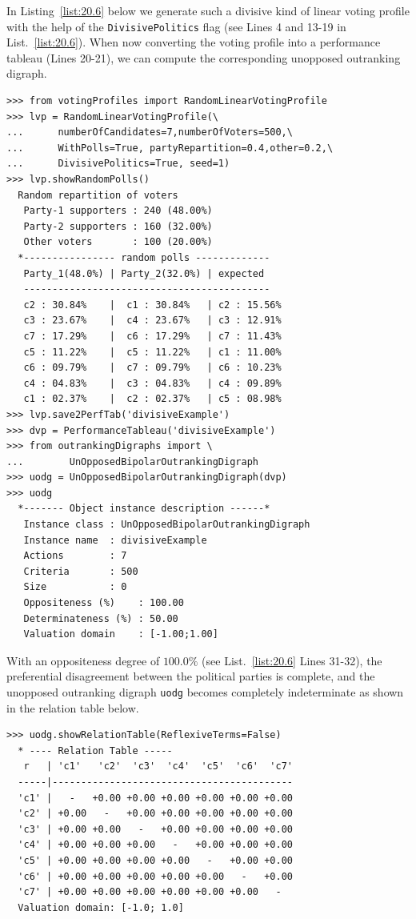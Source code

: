 In Listing~\vref{list:20.6} below we generate such a divisive kind of linear voting profile with the help of the \texttt{DivisivePolitics} flag (see Lines 4 and 13-19 in List.~\vref{list:20.6}). When now converting the voting profile into a performance tableau (Lines 20-21), we can compute the corresponding unopposed outranking digraph.
\begin{lstlisting}[caption={A divisive two-party example of a random linear voting profile},label=list:20.6]
>>> from votingProfiles import RandomLinearVotingProfile		     
>>> lvp = RandomLinearVotingProfile(\
...      numberOfCandidates=7,numberOfVoters=500,\
...      WithPolls=True, partyRepartition=0.4,other=0.2,\
...      DivisivePolitics=True, seed=1)
>>> lvp.showRandomPolls()
  Random repartition of voters
   Party-1 supporters : 240 (48.00%)
   Party-2 supporters : 160 (32.00%)
   Other voters       : 100 (20.00%)
  *---------------- random polls -------------
   Party_1(48.0%) | Party_2(32.0%) | expected  
   -------------------------------------------
   c2 : 30.84%    |  c1 : 30.84%   | c2 : 15.56%
   c3 : 23.67%    |  c4 : 23.67%   | c3 : 12.91%
   c7 : 17.29%    |  c6 : 17.29%   | c7 : 11.43%
   c5 : 11.22%    |  c5 : 11.22%   | c1 : 11.00%
   c6 : 09.79%    |  c7 : 09.79%   | c6 : 10.23%
   c4 : 04.83%    |  c3 : 04.83%   | c4 : 09.89%
   c1 : 02.37%    |  c2 : 02.37%   | c5 : 08.98%
>>> lvp.save2PerfTab('divisiveExample')
>>> dvp = PerformanceTableau('divisiveExample')
>>> from outrankingDigraphs import \
...        UnOpposedBipolarOutrankingDigraph
>>> uodg = UnOpposedBipolarOutrankingDigraph(dvp)
>>> uodg
  *------- Object instance description ------*
   Instance class : UnOpposedBipolarOutrankingDigraph
   Instance name  : divisiveExample
   Actions        : 7
   Criteria       : 500
   Size           : 0
   Oppositeness (%)    : 100.00
   Determinateness (%) : 50.00
   Valuation domain    : [-1.00;1.00]
\end{lstlisting}

With an oppositeness degree of $100.0\%$ (see List.~\vref{list:20.6} Lines 31-32), the preferential disagreement between the political parties is complete, and the unopposed outranking digraph \texttt{uodg} becomes completely indeterminate as shown in the relation table below.
\begin{lstlisting}
>>> uodg.showRelationTable(ReflexiveTerms=False)
  * ---- Relation Table -----
   r   | 'c1'   'c2'  'c3'  'c4'  'c5'  'c6'  'c7'   
  -----|------------------------------------------
  'c1' |   -   +0.00 +0.00 +0.00 +0.00 +0.00 +0.00  
  'c2' | +0.00   -   +0.00 +0.00 +0.00 +0.00 +0.00  
  'c3' | +0.00 +0.00   -   +0.00 +0.00 +0.00 +0.00  
  'c4' | +0.00 +0.00 +0.00   -   +0.00 +0.00 +0.00  
  'c5' | +0.00 +0.00 +0.00 +0.00   -   +0.00 +0.00  
  'c6' | +0.00 +0.00 +0.00 +0.00 +0.00   -   +0.00  
  'c7' | +0.00 +0.00 +0.00 +0.00 +0.00 +0.00   -   
  Valuation domain: [-1.0; 1.0]
\end{lstlisting}      

